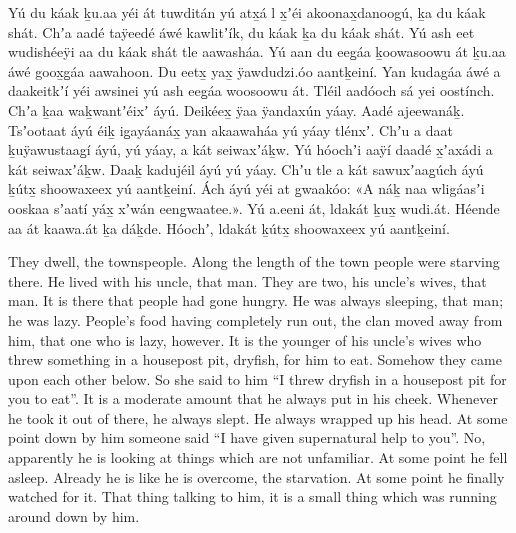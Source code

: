\begin{pairs}
\begin{Leftside}
Yú du káak ḵu.aa yéi át tuwditán yú atx̱á l x̱ʼéi akoonax̱danoogú, ḵa du káak shát.
Chʼa aadé taÿeedé áwé kawlitʼík, du káak ḵa du káak shát.
Yú ash eet wudishéeÿi aa du káak shát tle aawasháa.
Yú aan du eeg̱áa ḵoowasoowu át ḵu.aa áwé goox̱g̱áa aawahoon.
Du eetx̱ yax̱ ÿawdudzi.óo aantḵeiní.
Yan kuda\-gáa áwé a daakeitkʼí yéi awsinei yú ash eeg̱áa woosoowu át.
Tléil aadóoch sá yei oostínch.
Chʼa ḵaa waḵwantʼéixʼ áyú.
\pend
\pstart
{}Deikéex̱ ÿaa ÿandaxún yáay.
Aadé ajeewanáḵ.
Tsʼootaat áyú éiḵ ig̱ayáanáx̱ yan akaawaháa yú yáay tlénxʼ.
Chʼu a daat ḵu\-ÿa\-wustaag̱í áyú, yú yáay, a kát seiwaxʼáḵw.
Yú hóochʼi aaÿí daadé x̱ʼaxádi a kát seiwa\-xʼáḵw.
Daaḵ kadujéil áyú yú yáay.
Chʼu tle a kát sawuxʼaag̱úch áyú ḵútx̱ shoowa\-xeex yú aantḵeiní.
Ách áyú yéi at g̱waakóo:
«\!A náḵ naa wligáasʼi ooskaa sʼaatí yáx̱ xʼwán eeng̱waatee.\!».
Yú a.eeni át, ldakát ḵux̱ wudi.át.
Héende aa át kaawa.át ḵa dáḵde.
Hóochʼ, ldakát ḵútx̱ shoowaxeex yú aant\-ḵeiní.
\pend
\endnumbering
\end{Leftside}
\begin{Rightside}
\beginnumbering
\pstart
{}They dwell, the townspeople.
Along the length of the town people were starving there.
He lived with his uncle, that man.
They are two, his uncle’s wives, that man.
It is there that people had gone hungry.
He was always sleeping, that man;
he was lazy.
People’s food having completely run out, the clan moved away from him,
		that one who is lazy, however.
It is the younger of his uncle’s wives who threw something in a housepost pit, dryfish, for him to eat.
Somehow they came upon each other below.
So she said to him
\qqk{}“I threw dryfish in a housepost pit for you to eat”.
It is a moderate amount that he always put in his cheek.
Whenever he took it out of there, he always slept.
He always wrapped up his head.
\pend
\pstart
{}At some point down by him someone said
\qqk{}“I have given supernatural help to you”.
No, apparently he is looking at things which are not unfamiliar.
At some point he fell asleep.
Already he is like he is overcome, the starvation.
At some point he finally watched for it.
That thing talking to him, it is a small thing which was running around down by him.

\end{Rightside}
\end{pairs}
